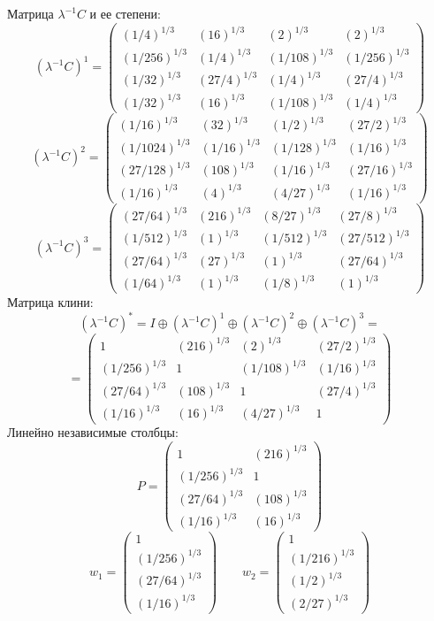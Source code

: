 Матрица $\lambda^{-1}C$ и ее степени:
$$(\lambda^{-1}C)^1 = \begin{pmatrix}
(1/4)^{1/3} & (16)^{1/3} & (2)^{1/3} & (2)^{1/3}\\
(1/256)^{1/3} & (1/4)^{1/3} & (1/108)^{1/3} & (1/256)^{1/3}\\
(1/32)^{1/3} & (27/4)^{1/3} & (1/4)^{1/3} & (27/4)^{1/3}\\
(1/32)^{1/3} & (16)^{1/3} & (1/108)^{1/3} & (1/4)^{1/3}
\end{pmatrix}
$$
$$(\lambda^{-1}C)^2 = \begin{pmatrix}
(1/16)^{1/3} & (32)^{1/3} & (1/2)^{1/3} & (27/2)^{1/3}\\
(1/1024)^{1/3} & (1/16)^{1/3} & (1/128)^{1/3} & (1/16)^{1/3}\\
(27/128)^{1/3} & (108)^{1/3} & (1/16)^{1/3} & (27/16)^{1/3}\\
(1/16)^{1/3} & (4)^{1/3} & (4/27)^{1/3} & (1/16)^{1/3}
\end{pmatrix}
$$
$$(\lambda^{-1}C)^3 = \begin{pmatrix}
(27/64)^{1/3} & (216)^{1/3} & (8/27)^{1/3} & (27/8)^{1/3}\\
(1/512)^{1/3} & (1)^{1/3} & (1/512)^{1/3} & (27/512)^{1/3}\\
(27/64)^{1/3} & (27)^{1/3} & (1)^{1/3} & (27/64)^{1/3}\\
(1/64)^{1/3} & (1)^{1/3} & (1/8)^{1/3} & (1)^{1/3}
\end{pmatrix}
$$
Матрица клини:
$$(\lambda^{-1}C)^* = I \oplus (\lambda^{-1}C)^1 \oplus (\lambda^{-1}C)^2 \oplus (\lambda^{-1}C)^3 = $$
$$ = \begin{pmatrix}
1 & (216)^{1/3} & (2)^{1/3} & (27/2)^{1/3}\\
(1/256)^{1/3} & 1 & (1/108)^{1/3} & (1/16)^{1/3}\\
(27/64)^{1/3} & (108)^{1/3} & 1 & (27/4)^{1/3}\\
(1/16)^{1/3} & (16)^{1/3} & (4/27)^{1/3} & 1
\end{pmatrix}
$$
Линейно независимые столбцы:
$$P = \begin{pmatrix}
1 & (216)^{1/3}\\
(1/256)^{1/3} & 1\\
(27/64)^{1/3} & (108)^{1/3}\\
(1/16)^{1/3} & (16)^{1/3}
\end{pmatrix}
$$
$$w_1 = \begin{pmatrix}
1\\
(1/256)^{1/3}\\
(27/64)^{1/3}\\
(1/16)^{1/3}
\end{pmatrix}
\qquad w_2 = \begin{pmatrix}
1\\
(1/216)^{1/3}\\
(1/2)^{1/3}\\
(2/27)^{1/3}
\end{pmatrix}
$$
